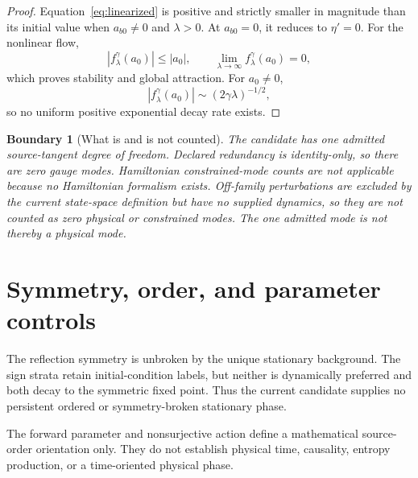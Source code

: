 \documentclass[11pt]{article}
\newtheorem{boundary}{Boundary}
\begin{document}
\begin{proof}
Equation~\eqref{eq:linearized} is positive and strictly smaller in magnitude
than its initial value when \(a_{b0}\neq0\) and \(\lambda>0\).  At
\(a_{b0}=0\), it reduces to \(\eta' =0\).  For the nonlinear flow,
\[
 |f^\gamma_\lambda(a_0)|\leq |a_0|,\qquad
 \lim_{\lambda\to\infty}f^\gamma_\lambda(a_0)=0,
\]
which proves stability and global attraction.  For \(a_0\neq0\),
\[
 |f^\gamma_\lambda(a_0)|
 \sim (2\gamma\lambda)^{-1/2},
\]
so no uniform positive exponential decay rate exists.
\end{proof}

\begin{boundary}[What is and is not counted]
The candidate has one admitted source-tangent degree of freedom.  Declared
redundancy is identity-only, so there are zero gauge modes.  Hamiltonian
constrained-mode counts are not applicable because no Hamiltonian formalism
exists.  Off-family perturbations are excluded by the current state-space
definition but have no supplied dynamics, so they are not counted as zero
physical or constrained modes.  The one admitted mode is not thereby a
physical mode.
\end{boundary}

\section{Symmetry, order, and parameter controls}

The reflection symmetry is unbroken by the unique stationary background.
The sign strata retain initial-condition labels, but neither is dynamically
preferred and both decay to the symmetric fixed point.  Thus the current
candidate supplies no persistent ordered or symmetry-broken stationary
phase.

The forward parameter and nonsurjective action define a mathematical
source-order orientation only.  They do not establish physical time,
causality, entropy production, or a time-oriented physical phase.
\end{document}
